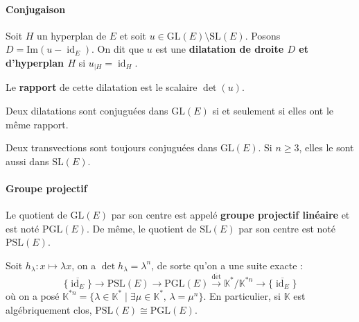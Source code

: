   \paragraph{Conjugaison}

  \begin{definition}
    Soit $H$ un hyperplan de $E$ et soit $u \in \mathrm{GL}(E) \setminus \mathrm{SL}(E)$. Posons $D = \mathrm{Im}(u - \operatorname{id}_E)$. On dit que $u$ est une \textbf{dilatation de droite $D$ et d'hyperplan $H$} si $u_{|H} = \operatorname{id}_H$.

    \medskip
    Le \textbf{rapport} de cette dilatation est le scalaire $\det(u)$.
  \end{definition}

  \begin{proposition}
    Deux dilatations sont conjuguées dans $\mathrm{GL}(E)$ si et seulement si elles ont le même rapport.
  \end{proposition}

  \begin{proposition}
    Deux transvections sont toujours conjuguées dans $\mathrm{GL}(E)$. Si $n \geq 3$, elles le sont aussi dans $\mathrm{SL}(E)$.
  \end{proposition}

  \paragraph{Groupe projectif}

  \begin{definition}
    Le quotient de $\mathrm{GL}(E)$ par son centre est appelé \textbf{groupe projectif linéaire} et est noté $\mathrm{PGL}(E)$. De même, le quotient de $\mathrm{SL}(E)$ par son centre est noté $\mathrm{PSL}(E)$.
  \end{definition}

  \begin{remark}
    Soit $h_\lambda : x \mapsto \lambda x$, on a $\det h_\lambda = \lambda^n$, de sorte qu'on a une suite exacte :
    \[ \{ \overline{\operatorname{id}_E} \} \rightarrow \mathrm{PSL}(E) \rightarrow \mathrm{PGL}(E) \xrightarrow{\overline{\det}} \mathbb{K}^*/\mathbb{K}^{*n} \rightarrow \{ \overline{\operatorname{id}_E} \} \]
    où on a posé $\mathbb{K}^{*n} = \{ \lambda \in \mathbb{K}^* \mid \exists \mu \in \mathbb{K}^*, \, \lambda = \mu^n \}$. En particulier, si $\mathbb{K}$ est algébriquement clos, $\mathrm{PSL}(E) \cong \mathrm{PGL}(E)$.
  \end{remark}

